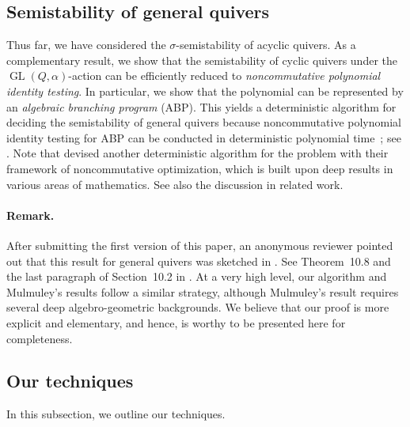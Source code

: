 \documentclass[a4paper,11pt]{article}
\numberwithin{equation}{section}
\DeclareMathOperator{\GL}{GL}
\begin{document}
\subsection{Semistability of general quivers}\label{subsec:general-quiver}
Thus far, we have considered the $\sigma$-semistability of acyclic quivers.
As a complementary result, we show that the semistability of cyclic quivers under the $\GL(Q, \alpha)$-action can be efficiently reduced to \emph{noncommutative polynomial identity testing}.
In particular, we show that the polynomial can be represented by an \emph{algebraic branching program} (ABP).
This yields a deterministic algorithm for deciding the semistability of general quivers because noncommutative polynomial identity testing for ABP can be conducted in deterministic polynomial time~\citep{Raz2005}; see .
Note that \citep{Burgisser2019} devised another deterministic algorithm for the problem with their framework of noncommutative optimization, which is built upon deep results in various areas of mathematics.
See also the discussion in related work.

\paragraph{Remark.}
After submitting the first version of this paper, an anonymous reviewer pointed out that this result for general quivers was sketched in \citet{Mulmuley2017}. See Theorem~10.8 and the last paragraph of Section~10.2 in \citet{Mulmuley2017}. 
At a very high level, our algorithm and Mulmuley's results follow a similar strategy, although Mulmuley's result requires several deep algebro-geometric backgrounds.
We believe that our proof is more explicit and elementary, and hence, is worthy to be presented here for completeness.


\subsection{Our techniques}
In this subsection, we outline our techniques.
\end{document}
